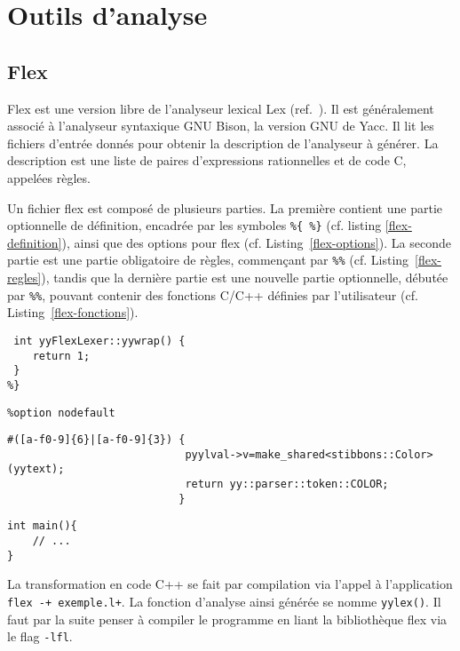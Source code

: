 \section{Outils d'analyse}

\subsection{Flex}
\label{Flex}

Flex est une version libre de l'analyseur lexical Lex (ref.~\cite{flex}). Il est généralement associé à l'analyseur syntaxique GNU Bison, la version GNU de Yacc.
Il lit les fichiers d'entrée donnés pour obtenir la description de l'analyseur à générer. La description est une liste de paires d'expressions rationnelles et de code C, appelées règles.

Un fichier flex est composé de plusieurs parties. La première contient une partie optionnelle de définition, encadrée par les symboles \verb|%{ %}| (cf. listing \ref{flex-definition}), ainsi que des options pour flex (cf. Listing~\ref{flex-options}). La seconde partie est une partie obligatoire de règles, commençant par \verb|%%| (cf. Listing~\ref{flex-regles}), tandis que la dernière partie est une nouvelle partie optionnelle, débutée par \verb|%%|, pouvant contenir des fonctions C/C++ définies par l'utilisateur (cf. Listing~\ref{flex-fonctions}).

\begin{lstlisting}[caption=Partie définition d'un fichier flex,label=flex-definition]
%{
 int yyFlexLexer::yywrap() {
	return 1;
 }
%}
\end{lstlisting}

\begin{lstlisting}[caption=Options flex,label=flex-options]
%option c++
%option nodefault
\end{lstlisting}

\begin{lstlisting}[label=flex-regles,caption=Partie règles de flex]
%%
#([a-f0-9]{6}|[a-f0-9]{3}) {
							pyylval->v=make_shared<stibbons::Color>(yytext);
							return yy::parser::token::COLOR;
						   }
\end{lstlisting}
\begin{lstlisting}[label=flex-fonctions,caption=Partie fonctions de flex]
%%
int main(){
	// ...
}
\end{lstlisting}

La transformation en code C++ se fait par compilation via l'appel à l'application \verb|flex -+ exemple.l+|. La fonction d'analyse ainsi générée se nomme \verb|yylex()|.
Il faut par la suite penser à compiler le programme en liant la bibliothèque flex via le flag \verb|-lfl|.

